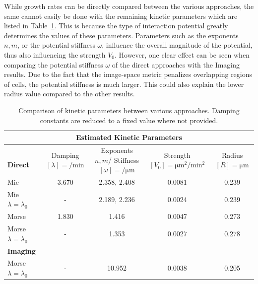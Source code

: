 While growth rates can be directly compared between the various approaches, the same cannot easily
be done with the remaining kinetic parameters which are listed in
Table~\ref{tab:comparison-kinetic-parameters}.
This is because the type of interaction potential greatly determines the values of these parameters.
Parameters such as the exponents $n,m$, or the potential stiffness $\omega$, influence the overall
magnitude of the potential, thus also influencing the strength $V_0$.
However, one clear effect can be seen when comparing the potential stiffness $\omega$ of the direct
approaches with the Imaging results.
Due to the fact that the image-space metric penalizes overlapping regions of cells, the potential
stiffness is much larger.
This could also explain the lower radius value compared to the other results.

\begin{table}[H]
    \centering
    \begin{tabular}{l c c c c}
        \multicolumn{5}{c}{Estimated Kinetic Parameters}\\
        \toprule
        \makecell[l]{\\\textbf{Direct}}
            & \makecell{Damping\\$[\lambda]=\unit{\per\minute}$}
            & \makecell{Exponents $n,m$/\\Stiffness $[\omega]=\unit{\per\micro\metre}$}
            & \makecell{Strength\\$[V_0]=\unit{\micro\metre^2\per\minute^2}$}
            & \makecell{Radius\\$[R]=\unit{\micro\metre}$}\\
        \midrule
        Mie                         & 3.670 & 2.358, 2.408 & 0.0081 & 0.239\\
        Mie $\lambda=\lambda_0$     & -     & 2.189, 2.236 & 0.0024 & 0.239\\
        Morse                       & 1.830 & 1.416 & 0.0047 & 0.273\\
        Morse $\lambda=\lambda_0$   & -     & 1.353 & 0.0027 & 0.278\\
        \textbf{Imaging}\\
        \midrule
        Morse $\lambda=\lambda_0$   & - & 10.952 & 0.0038 & 0.205\\
        \bottomrule
    \end{tabular}
    \caption[Comparison of kinetic Parameters]{
        Comparison of kinetic parameters between various approaches.
        Damping constants are reduced to a fixed value where not provided.
    }
    \label{tab:comparison-kinetic-parameters}
\end{table}

